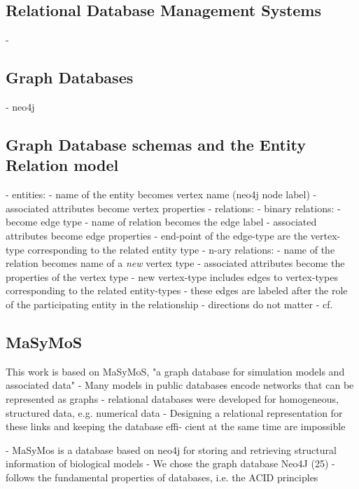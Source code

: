 	\subsection{Relational Database Management Systems}
	- \todo
	
	\subsection{Graph Databases}
	- neo4j
	
	\subsection{Graph Database schemas and the Entity Relation model}
	- entities:
		- name of the entity becomes vertex name (neo4j node label)
		- associated attributes become vertex properties
	- relations:
		- binary relations:
			- become edge type
			- name of relation becomes the edge label
			- associated attributes become edge properties
			- end-point of the edge-type are the vertex-type corresponding to the related entity type
		- n-ary relations:
			- name of the relation becomes name of a \emph{new} vertex type
			- associated attributes become the properties of the vertex type
			- new vertex-type includes edges to vertex-types corresponding to the related entity-types
			- these edges are labeled after the role of the participating entity in the relationship
			- directions do not matter
	- cf. \cite{Siriwaradhana2014}
	
	\subsection{MaSyMoS}
	This work is based on MaSyMoS, "a graph database for simulation models and associated data" \cite{Henkel2015}
		- \cite{Henkel2015} Many models in public databases encode networks that can be represented as graphs
		- \cite{Henkel2015} relational databases were developed for homogeneous, structured data, e.g. numerical data
		- \cite{Henkel2015} Designing a relational representation for these links and keeping the database effi- cient at the same time are impossible
	
	- \cite{Henkel2015} MaSyMos is a database based on neo4j for storing and retrieving structural information of biological models
		- \cite{Henkel2015} We chose the graph database Neo4J (25)
		- \cite{Henkel2015} follows the fundamental properties of databases, i.e. the ACID principles
		
